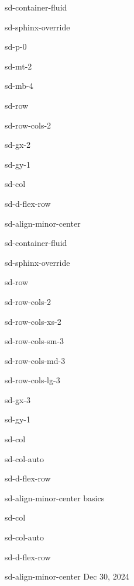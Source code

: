 \documentclass[letterpaper,10pt,english]{jupyterBook}
\begin{document}
\sphinxstepscope

\begin{sphinxuseclass}{sd-container-fluid}
\begin{sphinxuseclass}{sd-sphinx-override}
\begin{sphinxuseclass}{sd-p-0}
\begin{sphinxuseclass}{sd-mt-2}
\begin{sphinxuseclass}{sd-mb-4}
\begin{sphinxuseclass}{sd-row}
\begin{sphinxuseclass}{sd-row-cols-2}
\begin{sphinxuseclass}{sd-gx-2}
\begin{sphinxuseclass}{sd-gy-1}
\begin{sphinxuseclass}{sd-col}
\begin{sphinxuseclass}{sd-d-flex-row}
\begin{sphinxuseclass}{sd-align-minor-center}
\begin{sphinxuseclass}{sd-container-fluid}
\begin{sphinxuseclass}{sd-sphinx-override}
\begin{sphinxuseclass}{sd-row}
\begin{sphinxuseclass}{sd-row-cols-2}
\begin{sphinxuseclass}{sd-row-cols-xs-2}
\begin{sphinxuseclass}{sd-row-cols-sm-3}
\begin{sphinxuseclass}{sd-row-cols-md-3}
\begin{sphinxuseclass}{sd-row-cols-lg-3}
\begin{sphinxuseclass}{sd-gx-3}
\begin{sphinxuseclass}{sd-gy-1}
\begin{sphinxuseclass}{sd-col}
\begin{sphinxuseclass}{sd-col-auto}
\begin{sphinxuseclass}{sd-d-flex-row}
\begin{sphinxuseclass}{sd-align-minor-center}
\sphinxAtStartPar
basics

\end{sphinxuseclass}
\end{sphinxuseclass}
\end{sphinxuseclass}
\end{sphinxuseclass}
\begin{sphinxuseclass}{sd-col}
\begin{sphinxuseclass}{sd-col-auto}
\begin{sphinxuseclass}{sd-d-flex-row}
\begin{sphinxuseclass}{sd-align-minor-center}
\sphinxAtStartPar
Dec 30, 2024


\end{sphinxuseclass}
\end{sphinxuseclass}
\end{sphinxuseclass}
\end{sphinxuseclass}
\end{sphinxuseclass}
\end{sphinxuseclass}
\end{sphinxuseclass}
\end{sphinxuseclass}
\end{sphinxuseclass}
\end{sphinxuseclass}
\end{sphinxuseclass}
\end{sphinxuseclass}
\end{sphinxuseclass}
\end{sphinxuseclass}
\end{sphinxuseclass}
\end{sphinxuseclass}
\end{sphinxuseclass}
\end{sphinxuseclass}
\end{sphinxuseclass}
\end{sphinxuseclass}
\end{sphinxuseclass}
\end{sphinxuseclass}
\end{sphinxuseclass}
\end{sphinxuseclass}
\end{sphinxuseclass}
\end{sphinxuseclass}
\end{document}
